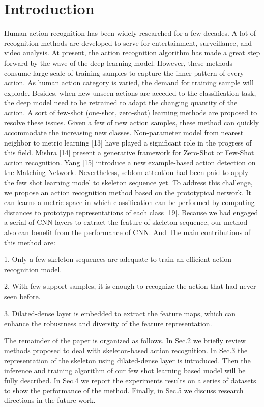 \documentclass{bmvc2k}
\begin{document}
\section{Introduction}
\label{sec:intro}
Human action recognition has been widely researched for a few decades. A lot of recognition methods are developed to serve for entertainment, surveillance, and video analysis. At present, the action recognition algorithm has made a great step forward by the wave of the deep learning model. However, these methods consume large-scale of training samples to capture the inner pattern of every action. As human action category is varied, the demand for training sample will explode. Besides, when new unseen actions are acceded to the classification task, the deep model need to be retrained to adapt the changing quantity of the action. A sort of few-shot (one-shot, zero-shot) learning methods are proposed to resolve these issues. Given a few of new action samples, these method can quickly accommodate the increasing new classes. Non-parameter model from nearest neighbor to metric learning [13] have played a significant role in the progress of this field. Mishra [14] present a generative framework for Zero-Shot or Few-Shot action recognition. Yang [15] introduce a new example-based action detection on the Matching Network. Nevertheless, seldom attention had been paid to apply the few shot learning model to skeleton sequence yet. To address this challenge, we propose an action recognition method based on the prototypical network. It can learns a metric space in which classification can be performed by computing distances to prototype representations of each class [19]. Because we had engaged a serial of CNN layers to extract the feature of skeleton sequence, our method also can benefit from the performance of CNN. And The main contributions of this method are:

1.	Only a few skeleton sequences are adequate to train an efficient action recognition model.

2.	With few support samples, it is enough to recognize the action that had never seen before.

3.	Dilated-dense layer is embedded to extract the feature maps, which can enhance the robustness and diversity of the feature representation. 

The remainder of the paper is organized as follows. In Sec.2 we briefly review methods proposed to deal with skeleton-based action recognition. In Sec.3 the representation of the skeleton using dilated-dense layer is introduced. Then the inference and training algorithm of our few shot learning based model will be fully described. In Sec.4 we report the experiments results on a series of datasets to show the performance of the method. Finally, in Sec.5 we discuss research directions in the future work.
\end{document}
